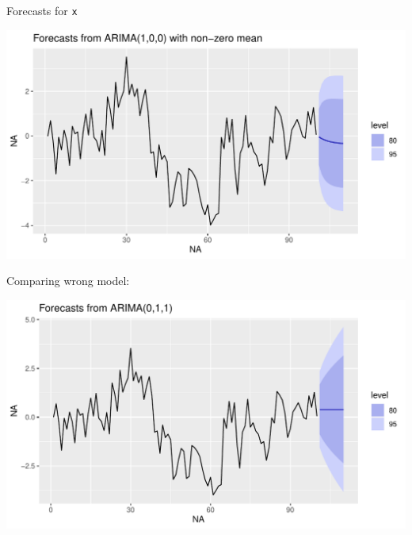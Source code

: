 \documentclass[ignorenonframetext,]{beamer}
\newenvironment{Shaded}{\begin{snugshade}}{\end{snugshade}}
\newcommand{\KeywordTok}[1]{\textcolor[rgb]{0.13,0.29,0.53}{\textbf{#1}}}
\newcommand{\NormalTok}[1]{#1}
\newcommand{\OperatorTok}[1]{\textcolor[rgb]{0.81,0.36,0.00}{\textbf{#1}}}
\newcommand{\StringTok}[1]{\textcolor[rgb]{0.31,0.60,0.02}{#1}}
\begin{document}
\begin{frame}[fragile]{Forecasts for \texttt{x}}
\protect\hypertarget{forecasts-for-x}{}

\begin{Shaded}
\end{Shaded}

\includegraphics{figure/unnamed-chunk-616-1.pdf}

\end{frame}

\begin{frame}[fragile]{Comparing wrong model:}
\protect\hypertarget{comparing-wrong-model}{}

\begin{Shaded}
\end{Shaded}

\includegraphics{figure/unnamed-chunk-617-1.pdf}

\end{frame}
\end{document}
